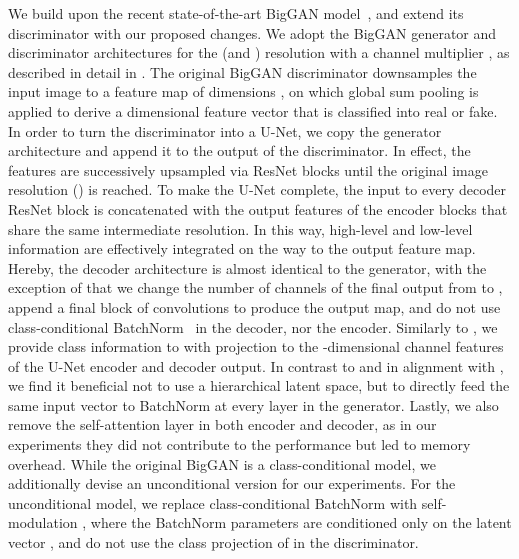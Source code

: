 \documentclass[10pt,twocolumn,letterpaper]{article}
\makeatletter
\renewcommand{\paragraph}{\@startsection{paragraph}{4}{\z@}{0.5ex plus 0.8ex minus .5ex}{-0.5em}{\normalsize\bf}}
\let\originalparagraph\paragraph
\renewcommand{\paragraph}[2][.]{\originalparagraph{#2#1}}
\makeatother
\begin{document}
\paragraph{U-Net based discriminator}
We build upon the recent state-of-the-art BigGAN model~\cite{Brock2019}, and extend its discriminator with our proposed changes.
We adopt the BigGAN generator and discriminator architectures for the  (and ) resolution with a channel multiplier , as described in detail in \cite{Brock2019}. The original BigGAN discriminator downsamples the input image to a feature map of dimensions , on which global sum pooling is applied to derive a  dimensional feature vector that is classified into real or fake. In order to turn the discriminator into a U-Net, we copy the generator architecture and append it to the  output of the discriminator.
In effect, the features are successively upsampled via ResNet blocks until the original image resolution () is reached. To make the U-Net complete, the input to every decoder ResNet block is concatenated with the output features of the encoder blocks that share the same intermediate resolution. In this way, high-level and low-level information are effectively integrated on the way to the output feature map.
Hereby, the decoder architecture is almost identical to the generator, with the exception of that we change the number of channels of the final output from  to , append a final block of  convolutions to produce the  output map, and do not use class-conditional BatchNorm~\cite{Vries2017ModulatingEV,Dumoulin2016ALR} in the decoder, nor the encoder.
Similarly to \cite{Brock2019}, we provide class information to  with projection \cite{miyato2018cgans} to the -dimensional channel features
of the U-Net encoder and decoder output.
In contrast to \cite{Brock2019} and in alignment with \cite{Chen2018OnSM}, we find it beneficial not to use a hierarchical latent space, but to directly feed the same input vector  to BatchNorm at every layer in the generator.
Lastly, we also remove the self-attention layer in both encoder and decoder, as in our experiments they did not contribute to the performance but led to memory overhead.
While the original BigGAN is a class-conditional model, we additionally devise an unconditional version for our experiments. For the unconditional model, we replace class-conditional BatchNorm with self-modulation \cite{Chen2018OnSM}, where the BatchNorm parameters are conditioned only on the latent vector , and do not use the class projection of \cite{miyato2018cgans} in the discriminator.
\end{document}
